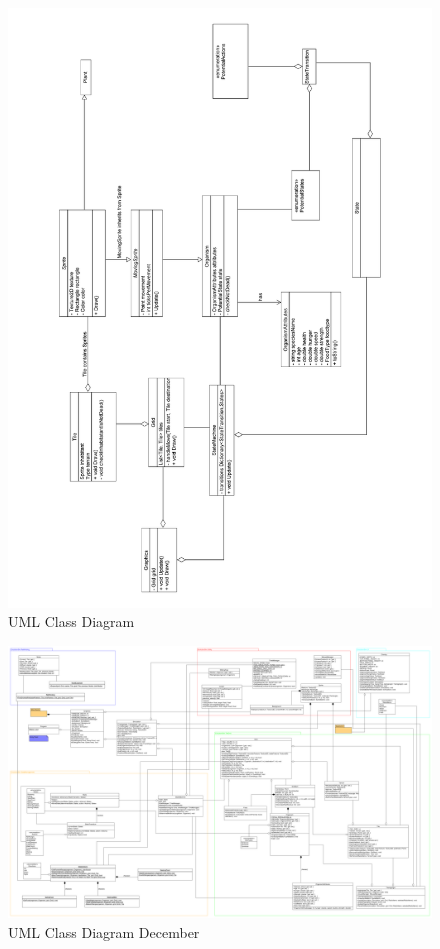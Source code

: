 \documentclass[a4paper, oneside, 11pt]{report}
\begin{document}
{\begin{figure}[H]
	\caption{UML Class Diagram}\label{classdiagram}
	\includegraphics[width=\textwidth]{class-diagram}
\end{figure}

\begin{landscape}
	\begin{figure}[H]
		\caption{UML Class Diagram December}\label{classdiagram-2}
		\includegraphics[height=\textheight]{class-diagram-2}
	\end{figure}
\end{landscape}

}
\end{document}
